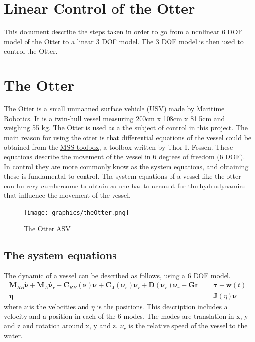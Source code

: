 \documentclass[12pt,a4]{article}
\begin{document}
\section{Linear Control of the Otter}
This document describe the steps taken in order to go from a nonlinear 6 DOF model of the Otter to a linear 3 DOF model.
The 3 DOF model is then used to control the Otter.
\section{The Otter}
The Otter is a small unmanned surface vehicle (USV) made by Maritime Robotics. It is a twin-hull vessel measuring 200cm x 108cm x 81.5cm and weighing 55 kg.
The Otter is used as a the subject of control in this project. The main reason for using the otter is that differential equations of the vessel could be obtained from the
\href{https://github.com/cybergalactic/MSS/blob/master/VESSELS/otter.m}{MSS toolbox}, a toolbox written by Thor I. Fossen. These equations describe the movement of the vessel in 6 degrees of freedom (6 DOF). In control they are more commonly know as the system equations, and obtaining these is fundamental to control. The system equations of a vessel like the otter can be very cumbersome to obtain as one has to account for the hydrodynamics that influence the movement of the vessel.
\begin{figure}[H]
	\centering
	\texttt{[image: graphics/theOtter.png]}
	\caption{The Otter ASV}
	\label{fig:theOtter}
\end{figure}

\subsection{The system equations}
The dynamic of a vessel can be described as follows, using a 6 DOF model.
\begin{align}
	\label{eq:standard_nu}
	\bm{M}_{RB}\bm{\dot{\nu}} + \bm{M}_{A}\bm{\dot{\nu_r}} + \bm{C}_{RB}(\bm{\nu})\bm{\nu} + \bm{C}_{A}(\bm{\nu}_r)\bm{\nu}_r
	+ \bm{D}(\bm{\nu}_r)\bm{\nu}_r +\bm{G}\bm{\eta} & = \bm{\tau} + \bm{w}(t) \\
	\bm{\dot{\eta}}                                 & = \bm{J}(\eta)\bm{\nu}
\end{align}
where $\nu$ is the velocities and $\eta$ is the positions. This description includes a velocity and a position in each of the 6 modes.
The modes are translation in x, y and z and rotation around x, y and z. $\nu_r$ is the relative speed of the vessel to the water.
\end{document}
